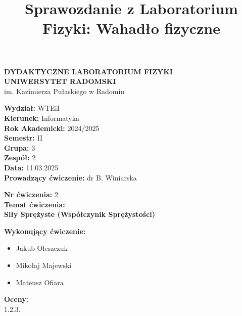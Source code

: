 \documentclass[12pt]{article}
\title{Sprawozdanie z Laboratorium Fizyki: Wahadło fizyczne}
\date{}
\begin{document}
\begin{titlepage}
    \centering
    \Large
    \textbf{DYDAKTYCZNE LABORATORIUM FIZYKI} \\
    \vspace{0.2cm}
    \textbf{UNIWERSYTET RADOMSKI}\\
    im. Kazimierza Pułaskiego w Radomiu \\
    
    \vspace{1.5cm}
    \begin{flushleft}
        \textbf{Wydział:} {WTEiI} \\
        \textbf{Kierunek:} Informatyka \\
        \textbf{Rok Akademicki:} 2024/2025 \\
        \textbf{Semestr:} II \\
        \textbf{Grupa:} 3 \\
        \textbf{Zespół:} 2 \\
        \textbf{Data:} 11.03.2025 \\
        \textbf{Prowadzący ćwiczenie:} dr B. Winiarska \\
    \end{flushleft}
    
    \vspace{1cm}
    \begin{flushleft}
        \textbf{Nr ćwiczenia:} 2 \\
        \textbf{Temat ćwiczenia:} \\
        \textbf{Siły Sprężyste (Współczynik Sprężystości)} \\
    \end{flushleft}
    
    \vspace{1cm}
    \begin{flushleft}
        \textbf{Wykonujący ćwiczenie:}
        \begin{itemize}
            \item Jakub Oleszczuk
            \item Mikołaj Majewski
            \item Mateusz Ofiara
        \end{itemize}
    \end{flushleft}

    \vfill
    \begin{flushleft}
        \textbf{Oceny:} \\
        1.\hspace{2cm}2.\hspace{2cm}3.
    \end{flushleft}
\end{titlepage}
\end{document}

